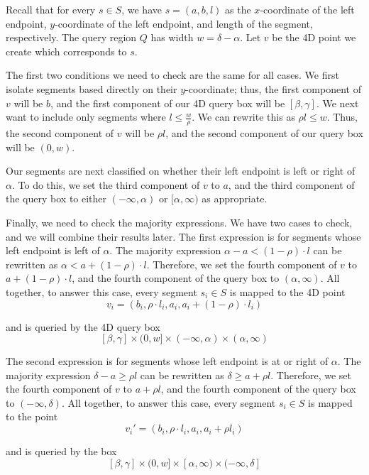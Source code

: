 Recall that for every $s \in S$, we have $s = (a, b, l)$ as the $x$-coordinate of the left endpoint, $y$-coordinate of the left endpoint, and length of the segment, respectively.  The query region $Q$ has width $w = \delta - \alpha$. Let $v$ be the 4D point we create which corresponds to $s$.

The first two conditions we need to check are the same for all cases. We first isolate segments based directly on their $y$-coordinate; thus, the first component of $v$ will be $b$, and the first component of our 4D query box will be $[\beta, \gamma]$.  We next want to include only segments where $l \leq \frac{w}{\rho}$. We can rewrite this as $\rho l \leq w$. Thus, the second component of $v$ will be $\rho l$, and the second component of our query box will be $(0, w)$.

Our segments are next classified on whether their left endpoint is left or right of $\alpha$. To do this, we set the third component of $v$ to $a$, and the third component of the query box to either $(-\infty, \alpha)$ or $[\alpha, \infty)$ as appropriate.

Finally, we need to check the majority expressions. We have two cases to check, and we will combine their results later. The first expression is for segments whose left endpoint is left of $\alpha$. The majority expression $\alpha - a < (1 - \rho) \cdot l$ can be rewritten as $\alpha < a + (1-\rho) \cdot l$. Therefore, we set the fourth component of $v$ to $a + (1 - \rho) \cdot l$, and the fourth component of the query box to $(\alpha, \infty)$.  All together, to answer this case, every segment $s_i \in S$ is mapped to the 4D point 
\[ 
v_i = (b_i, \rho \cdot l_i, a_i, a_i + (1-\rho) \cdot l_i)
\]

\noindent and is queried by the 4D query box
\[
[\beta, \gamma] \times (0, w] \times (-\infty, \alpha) \times (\alpha, \infty)
\]

The second expression is for segments whose left endpoint is at or right of $\alpha$. The majority expression $\delta - a \geq \rho l$ can be rewritten as $\delta \geq a + \rho l$. Therefore, we set the fourth component of $v$ to $a + \rho l$, and the fourth component of the query box to $(-\infty, \delta)$.  All together, to answer this case, every segment $s_i \in S$ is mapped to the point
\[
v_i' = (b_i, \rho \cdot l_i, a_i, a_i + \rho l_i)
\]

\noindent and is queried by the box
\[
[\beta, \gamma] \times (0, w] \times [\alpha, \infty) \times (-\infty, \delta]
\]

